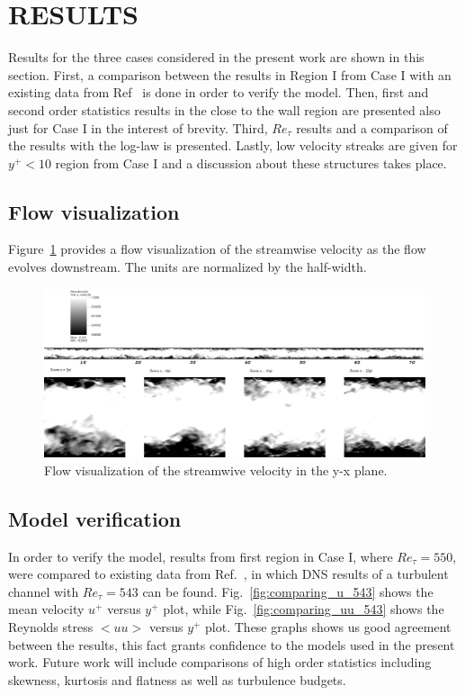 \documentclass[twocolumn,10pt]{asme2e}
\begin{document}

\section*{RESULTS}

Results for the three cases considered in the present work are shown in this section. First, a comparison between the results in Region I from Case I with an existing data from Ref~\cite{myoungkyu2015} is done in order to verify the model. Then, first and second order statistics results in the close to the wall region are presented also just for Case I in the interest of brevity. Third, \(Re_{\tau}\) results and a comparison of the results with the log-law is presented. Lastly, low velocity streaks are given for \(y^+<10\) region from Case I and a discussion about these structures takes place.

\subsection*{Flow visualization}

Figure~\ref{fig:flow_viz} provides a flow visualization of the streamwise velocity as the flow evolves downstream. The units are normalized by the half-width.

\begin{figure}[t]
    \includegraphics[width=\textwidth]{flow_field_x_y_with_label.pdf}
    \caption{Flow visualization of the streamwive velocity in the y-x plane.}
    \label{fig:flow_viz}
\end{figure}

\subsection*{Model verification}

In order to verify the model, results from first region in Case I, where \(Re_{\tau}=550\), were compared to existing data from Ref.~\cite{myoungkyu2015}, in which DNS results of a turbulent channel with \(Re_{\tau}=543\) can be found. Fig.~\ref{fig:comparing_u_543} shows the mean velocity \(u^+\) versus \(y^+\) plot, while Fig.~\ref{fig:comparing_uu_543} shows the Reynolds stress \(<uu>\) versus \(y^+\) plot. These graphs shows us good agreement between the results, this fact grants confidence to the models used in the present work. Future work will include comparisons of high order statistics including skewness, kurtosis and flatness as well as turbulence budgets.
\end{document}
